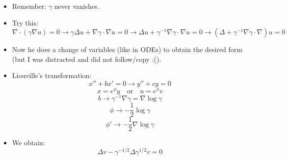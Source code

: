 \documentclass{article}
\begin{document}
\begin{itemize}
    \item Remember: $\gamma$ never vanishes.

    \item Try this:
    \begin{equation}
        \nabla \cdot(\gamma \nabla u) = 0 \rightarrow \gamma \Delta u + \nabla \gamma \cdot \nabla u = 0 \rightarrow \Delta u + \gamma^{-1} \nabla \gamma \cdot \nabla u =0 \rightarrow (\Delta + \gamma^{-1} \nabla \gamma \cdot \nabla) u = 0
    \end{equation}

    \item Now he does a change of variables (like in ODEs) to obtain the desired form (but I was distracted and did not follow/copy :().

    \item Liouville's transformation:
    \begin{equation}
        x'' + bx' = 0 \rightarrow y'' + cy = 0
    \end{equation}
    \begin{equation}
        x = e^\phi y \quad \text{or} \quad u = e^\phi v
    \end{equation}
    \begin{equation}
        b \rightarrow \gamma^{-1} \nabla \gamma = \nabla \log \gamma
    \end{equation}
    \begin{equation}
        \phi \rightarrow - \frac{1}{2} \log \gamma
    \end{equation}
    \begin{equation}
        \phi' \rightarrow - \frac{1}{2}\nabla \log \gamma
    \end{equation}

    \item We obtain:
    \begin{equation}
        \Delta v - \gamma^{-1/2} \Delta \gamma^{1/2} v  = 0
    \end{equation}
\end{itemize}
\end{document}
